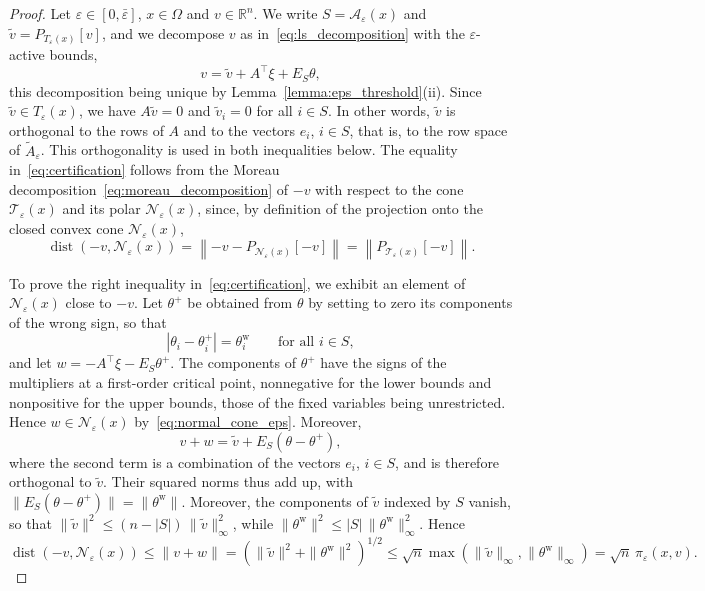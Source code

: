 \documentclass{article}
\numberwithin{equation}{section}
\newcommand{\RR}{{\mathbb{R}}} %
\newcommand{\calA}{{\mathcal{A}}}
\newcommand{\calN}{{\mathcal{N}}}
\newcommand{\calT}{{\mathcal{T}}}
\newcommand{\proj}[2]{P_{#1} \left[ {#2} \right]} %
\theoremstyle{plain}
\begin{document}
\begin{proof}
	Let $\varepsilon \in [0,\bar\varepsilon]$, $x \in \Omega$ and $v \in \RR^n$. We write $S = \calA_\varepsilon(x)$ and $\tilde{v} = \proj{T_\varepsilon(x)}{v}$, and we decompose $v$ as in~\eqref{eq:ls_decomposition} with the $\varepsilon$-active bounds,
	\[v = \tilde{v} + A^\top\xi + E_S\theta,\]
	this decomposition being unique by Lemma~\ref{lemma:eps_threshold}(ii). Since $\tilde{v} \in T_\varepsilon(x)$, we have $A\tilde{v} = 0$ and $\tilde{v}_i = 0$ for all $i \in S$. In other words, $\tilde{v}$ is orthogonal to the rows of $A$ and to the vectors $e_i$, $i \in S$, that is, to the row space of $\tilde{A}_\varepsilon$. This orthogonality is used in both inequalities below. The equality in~\eqref{eq:certification} follows from the Moreau decomposition~\eqref{eq:moreau_decomposition} of $-v$ with respect to the cone $\calT_\varepsilon(x)$ and its polar $\calN_\varepsilon(x)$, since, by definition of the projection onto the closed convex cone $\calN_\varepsilon(x)$,
	\[\operatorname{dist}\left(-v,\calN_\varepsilon(x)\right) = \left\|-v - \proj{\calN_\varepsilon(x)}{-v}\right\| = \left\|\proj{\calT_\varepsilon(x)}{-v}\right\|.\]

	To prove the right inequality in~\eqref{eq:certification}, we exhibit an element of $\calN_\varepsilon(x)$ close to $-v$. Let $\theta^+$ be obtained from $\theta$ by setting to zero its components of the wrong sign, so that
	\[|\theta_i - \theta^+_i| = \theta^{\mathrm{w}}_i \qquad \text{for all } i \in S,\]
	and let $w = -A^\top\xi - E_S\theta^+$. The components of $\theta^+$ have the signs of the multipliers at a first-order critical point, nonnegative for the lower bounds and nonpositive for the upper bounds, those of the fixed variables being unrestricted. Hence $w \in \calN_\varepsilon(x)$ by~\eqref{eq:normal_cone_eps}. Moreover,
	\[v + w = \tilde{v} + E_S(\theta-\theta^+),\]
	where the second term is a combination of the vectors $e_i$, $i \in S$, and is therefore orthogonal to $\tilde{v}$. Their squared norms thus add up, with $\|E_S(\theta-\theta^+)\| = \|\theta^{\mathrm{w}}\|$. Moreover, the components of $\tilde{v}$ indexed by $S$ vanish, so that $\|\tilde{v}\|^2 \le (n-|S|)\,\|\tilde{v}\|_\infty^2$, while $\|\theta^{\mathrm{w}}\|^2 \le |S|\,\|\theta^{\mathrm{w}}\|_\infty^2$. Hence
	\[\operatorname{dist}\left(-v,\calN_\varepsilon(x)\right) \le \|v+w\| = \left(\|\tilde{v}\|^2 + \|\theta^{\mathrm{w}}\|^2\right)^{1/2} \le \sqrt{n}\max\left(\|\tilde{v}\|_\infty,\|\theta^{\mathrm{w}}\|_\infty\right) = \sqrt{n}\,\pi_\varepsilon(x,v).\]


\end{proof}
\end{document}

